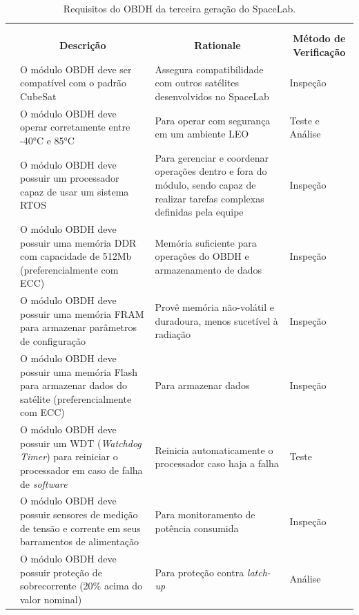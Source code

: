 \begin{longtable}{@{}>{\centering}p{1.5cm}p{4cm}p{4cm}p{4.7cm}@{}}
    \centering
	\ABNTEXfontereduzida
	\label{tab:Tab_Req}\tabularnewline
	\caption{Requisitos do OBDH da terceira geração do SpaceLab.}\tabularnewline
	\hline
	\multicolumn{1}{c}{\textbf{Índice}} & \multicolumn{1}{c}{\textbf{Descrição}} & \multicolumn{1}{c}{\textbf{Rationale}} & \multicolumn{1}{c}{\textbf{Método de Verificação}} \tabularnewline
        \hline
        1 & O módulo OBDH deve ser compatível com o padrão CubeSat & Assegura compatibilidade com outros satélites desenvolvidos no SpaceLab & Inspeção \tabularnewline
        
       \hline
        2 & O módulo OBDH deve operar corretamente entre -40°C e 85°C & Para operar com segurança em um ambiente LEO & Teste e Análise \tabularnewline

       \hline
       3 & O módulo OBDH deve possuir um processador capaz de usar um sistema RTOS & Para gerenciar e coordenar operações dentro e fora do módulo, sendo capaz de realizar tarefas complexas definidas pela equipe  & Inspeção \tabularnewline

       \hline
        4 & O módulo OBDH deve possuir uma memória DDR com capacidade de 512Mb (preferencialmente com ECC)  & Memória suficiente para operações do OBDH e armazenamento de dados  & Inspeção\tabularnewline

        \hline
       5 & O módulo OBDH deve possuir uma memória FRAM para armazenar parâmetros de configuração & Provê memória não-volátil e duradoura, menos sucetível à radiação & Inspeção \tabularnewline 

        \hline
        6 & O módulo OBDH deve possuir uma memória Flash para armazenar dados do satélite (preferencialmente com ECC) & Para armazenar dados & Inspeção \tabularnewline 

        \hline
       7 & O módulo OBDH deve possuir um WDT (\textit{Watchdog Timer}) para reiniciar o processador em caso de falha de \textit{software} & Reinicia automaticamente o processador caso haja a falha  & Teste \tabularnewline

        \hline
       8 & O módulo OBDH deve possuir sensores de medição de tensão e corrente em seus barramentos de alimentação & Para monitoramento de potência consumida & Inspeção \tabularnewline

        \hline
      9 &  O módulo OBDH deve possuir proteção de sobrecorrente (20\% acima do valor nominal) & Para proteção contra \textit{latch-up}  & Análise \tabularnewline


\end{longtable}
